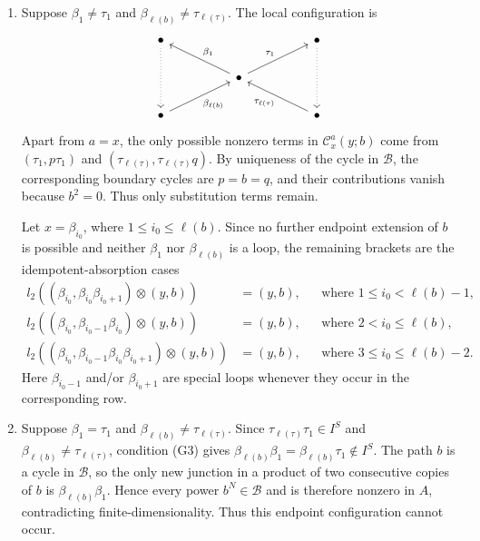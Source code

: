 \documentclass[11pt,a4paper,reqno]{amsart}
\newcommand{\mB}{\mathcal B}
\newcommand{\mC}{\mathcal C}
\newcommand{\para}[2]{(#1,#2)}
\newcommand{\taue}{\tau_{\ell(\tau)}}
\newcommand{\bi}{\beta_{i_0}}
\newcommand{\bet}{\beta_{\ell(b)}}
\theoremstyle{plain}
\theoremstyle{definition}
\numberwithin{equation}{section}
\begin{document}
	\begin{enumerate}
		\item Suppose $\beta_1\neq\tau_1$ and $\bet\neq\taue$.  The local
		configuration is
		\[
		\begin{tikzcd}
			\bullet &&&& \bullet \\
			&  & \bullet & \\
			\bullet &&&& \bullet
			\arrow[dotted, from=1-1, to=3-1]
			\arrow[dotted, from=1-5, to=3-5]
			\arrow["{\beta_1}"', from=2-3, to=1-1]
			\arrow["{\tau_1}", from=2-3, to=1-5]
			\arrow["\bet"', from=3-1, to=2-3]
			\arrow["\taue", from=3-5, to=2-3]
		\end{tikzcd}
		\]
		Apart from $a=x$, the only possible nonzero terms in $\mC_x^a(y;b)$ come
		from $\para{\tau_1}{p\tau_1}$ and $\para{\taue}{\taue q}$.  By uniqueness of
		the cycle in $\mB$, the corresponding boundary cycles are $p=b=q$, and their
		contributions vanish because $b^2=0$.  Thus only substitution terms
		remain.
		
		Let $x=\bi$, where $1\leq i_0\leq\ell(b)$. Since no further endpoint
		extension of $b$ is possible and neither $\beta_1$ nor $\bet$ is a
		loop, the remaining brackets are the idempotent-absorption cases
		\begin{equation}\label{mix-cycle-idempotent-absorption}
			\begin{aligned}
				l_2(\para{\bi}{\bi\beta_{i_0+1}}\otimes\para{y}{b})
				&=\para{y}{b},
				&&\text{where }1\le i_0<\ell(b)-1,\\
				l_2(\para{\bi}{\beta_{i_0-1}\bi}\otimes\para{y}{b})
				&=\para{y}{b},
				&&\text{where }2<i_0\le\ell(b),\\
				l_2(\para{\bi}{\beta_{i_0-1}\bi\beta_{i_0+1}}\otimes\para{y}{b})
				&=\para{y}{b},
				&&\text{where }3\le i_0\le\ell(b)-2.
			\end{aligned}
		\end{equation}
		Here $\beta_{i_0-1}$ and/or $\beta_{i_0+1}$ are special loops whenever
		they occur in the corresponding row.
		
		\item Suppose $\beta_1=\tau_1$ and $\bet\neq\taue$.  Since
		$\taue\tau_1\in I^S$ and $\bet\neq\taue$, condition
		\textup{(G3)} gives
		$\bet\beta_1=\bet\tau_1\notin I^S$.
		The path $b$ is a cycle in $\mB$, so the only new junction in a product of
		two consecutive copies of $b$ is $\bet\beta_1$.  Hence every power
		$b^N\in\mB$ and is therefore nonzero in $A$, contradicting
		finite-dimensionality.  Thus this endpoint configuration cannot occur.
		

\end{enumerate}
\end{document}
